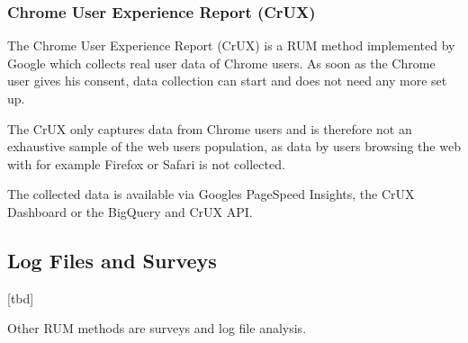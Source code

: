 









\subsubsection{Chrome User Experience Report (CrUX)}


The Chrome User Experience Report (CrUX) is a RUM method implemented by Google which collects real user data of Chrome users.
As soon as the Chrome user gives his consent, data collection can start and does not need any more set up.

The CrUX only captures data from Chrome users and is therefore not an exhaustive sample of the web users population, as data by users browsing the web with for example Firefox or Safari is not collected.

The collected data is available via Googles PageSpeed Insights, the CrUX Dashboard or the BigQuery and CrUX API. %







\subsection{Log Files and Surveys}

[tbd]

Other RUM methods are surveys and log file analysis.




